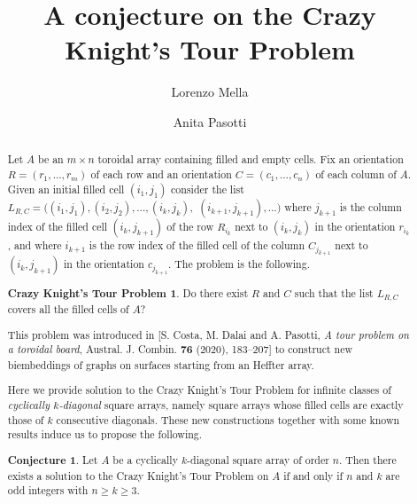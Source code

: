 \documentclass{amsart}
\theoremstyle{definition}
\newtheorem*{KN}{Crazy Knight's Tour Problem}
\newtheorem*{conjectureabs}{Conjecture}
\numberwithin{equation}{section}
\begin{document}
\title[A conjecture on the Crazy Knight's Tour Problem]{A conjecture on the Crazy Knight's Tour Problem}

\author[L. Mella]{Lorenzo Mella}
\address{}

\author[A. Pasotti]{Anita Pasotti}
\address{DICATAM - Sez. Matematica, Universit\`a degli Studi di Brescia, Via Branze 43, I-23123 Brescia, Italy}



\begin{abstract}
Let $A$ be an $m\times n$ toroidal array containing filled and empty cells. Fix an orientation $R=(r_1,\dots,r_m)$
of each row and an orientation $C=(c_1,\dots,c_n)$ of each column of $A$. Given an initial filled cell $(i_1,j_1)$ consider the list
$ L_{R,C}=((i_1,j_1),(i_2,j_2),\ldots,(i_k,j_k),$ $(i_{k+1},j_{k+1}),\ldots)$
where $j_{k+1}$ is the column index of the filled cell $(i_k,j_{k+1})$ of the row $R_{i_k}$ next to $(i_k,j_k)$ in the orientation $r_{i_k}$,
and where $i_{k+1}$ is the row index of the filled cell of the column $C_{j_{k+1}}$ next to $(i_k,j_{k+1})$ in the orientation $c_{j_{k+1}}$. The problem is the following.
\begin{KN}
Do there exist $R$ and $C$ such that the list $L_{R,C}$ covers all the filled cells of $A$?
\end{KN}
This problem was introduced in [S. Costa, M. Dalai and A. Pasotti, \textit{A tour problem on a toroidal board}, Austral. J. Combin. \textbf{76} (2020), 183--207] to construct new biembeddings of graphs on surfaces starting from an Heffter array.  

Here we provide solution to the Crazy Knight's Tour Problem for infinite classes of \emph{cyclically $k$-diagonal} square arrays, namely square arrays whose filled cells are exactly those of $k$ consecutive diagonals. These new constructions together with some known results induce us to propose the following.
\begin{conjectureabs}
Let $A$ be a cyclically $k$-diagonal square array of order $n$.  Then there exists a solution to the Crazy Knight's Tour Problem on $A$ if and only if $n$ and $k$ are odd integers with $n\geq k \geq3$.
\end{conjectureabs}
\end{abstract}

\maketitle
\end{document}
